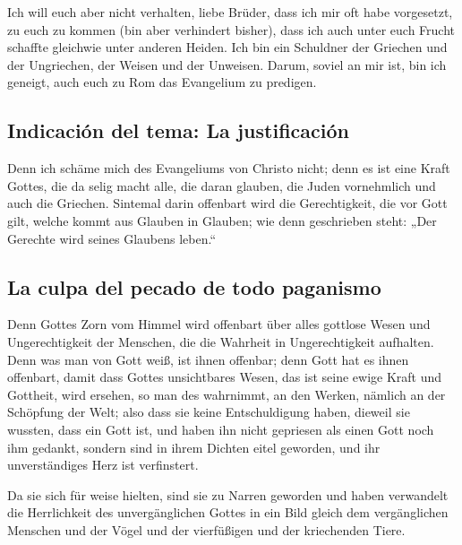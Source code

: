  Ich will euch aber nicht verhalten, liebe Brüder, dass
ich mir oft habe vorgesetzt, zu euch zu kommen (bin aber verhindert
bisher), dass ich auch unter euch Frucht schaffte gleichwie unter
anderen Heiden.  Ich bin ein Schuldner der Griechen und
der Ungriechen, der Weisen und der Unweisen.  Darum,
soviel an mir ist, bin ich geneigt, auch euch zu Rom das Evangelium zu
predigen.

\hypertarget{indicaciuxf3n-del-tema-la-justificaciuxf3n}{%
\subsection{Indicación del tema: La
justificación}\label{indicaciuxf3n-del-tema-la-justificaciuxf3n}}

 Denn ich schäme mich des Evangeliums von Christo nicht;
denn es ist eine Kraft Gottes, die da selig macht alle, die daran
glauben, die Juden vornehmlich und auch die Griechen. 
Sintemal darin offenbart wird die Gerechtigkeit, die vor Gott gilt,
welche kommt aus Glauben in Glauben; wie denn geschrieben steht: „Der
Gerechte wird seines Glaubens leben.``

\hypertarget{la-culpa-del-pecado-de-todo-paganismo}{%
\subsection{La culpa del pecado de todo
paganismo}\label{la-culpa-del-pecado-de-todo-paganismo}}

 Denn Gottes Zorn vom Himmel wird offenbart über alles
gottlose Wesen und Ungerechtigkeit der Menschen, die die Wahrheit in
Ungerechtigkeit aufhalten.  Denn was man von Gott weiß,
ist ihnen offenbar; denn Gott hat es ihnen offenbart, 
damit dass Gottes unsichtbares Wesen, das ist seine ewige Kraft und
Gottheit, wird ersehen, so man des wahrnimmt, an den Werken, nämlich an
der Schöpfung der Welt; also dass sie keine Entschuldigung haben,
 dieweil sie wussten, dass ein Gott ist, und haben ihn
nicht gepriesen als einen Gott noch ihm gedankt, sondern sind in ihrem
Dichten eitel geworden, und ihr unverständiges Herz ist verfinstert.

 Da sie sich für weise hielten, sind sie zu Narren
geworden  und haben verwandelt die Herrlichkeit des
unvergänglichen Gottes in ein Bild gleich dem vergänglichen Menschen und
der Vögel und der vierfüßigen und der kriechenden Tiere.

